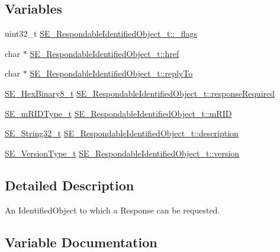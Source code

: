 \subsection*{Variables}
\begin{DoxyCompactItemize}
\item 
uint32\+\_\+t \hyperlink{group__RespondableIdentifiedObject_ga82b7a1e98f1e8257e1e251e1e12b21ad}{S\+E\+\_\+\+Respondable\+Identified\+Object\+\_\+t\+::\+\_\+flags}
\item 
char $\ast$ \hyperlink{group__RespondableIdentifiedObject_gad04aef488a91cb6cc560b43b0f2f136b}{S\+E\+\_\+\+Respondable\+Identified\+Object\+\_\+t\+::href}
\item 
char $\ast$ \hyperlink{group__RespondableIdentifiedObject_gacc38745c80ef60c65b39b81328769362}{S\+E\+\_\+\+Respondable\+Identified\+Object\+\_\+t\+::reply\+To}
\item 
\hyperlink{group__HexBinary8_gaecf2dab3615fb954a693c017a61f77d6}{S\+E\+\_\+\+Hex\+Binary8\+\_\+t} \hyperlink{group__RespondableIdentifiedObject_gac5e7e3639c4de39371139e684101f745}{S\+E\+\_\+\+Respondable\+Identified\+Object\+\_\+t\+::response\+Required}
\item 
\hyperlink{group__mRIDType_gac74622112f3a388a2851b2289963ba5e}{S\+E\+\_\+m\+R\+I\+D\+Type\+\_\+t} \hyperlink{group__RespondableIdentifiedObject_ga2daf457582bcbf32ba965d1ce49a5143}{S\+E\+\_\+\+Respondable\+Identified\+Object\+\_\+t\+::m\+R\+ID}
\item 
\hyperlink{group__String32_gac9f59b06b168b4d2e0d45ed41699af42}{S\+E\+\_\+\+String32\+\_\+t} \hyperlink{group__RespondableIdentifiedObject_ga0a1440d88b9a579911a3576fb2070051}{S\+E\+\_\+\+Respondable\+Identified\+Object\+\_\+t\+::description}
\item 
\hyperlink{group__VersionType_ga4b8d27838226948397ed99f67d46e2ae}{S\+E\+\_\+\+Version\+Type\+\_\+t} \hyperlink{group__RespondableIdentifiedObject_ga0cd2bf56b9f373bbdf164c8819041c18}{S\+E\+\_\+\+Respondable\+Identified\+Object\+\_\+t\+::version}
\end{DoxyCompactItemize}


\subsection{Detailed Description}
An Identified\+Object to which a Response can be requested. 

\subsection{Variable Documentation}
\mbox{\label{group__RespondableIdentifiedObject_ga82b7a1e98f1e8257e1e251e1e12b21ad}} 
